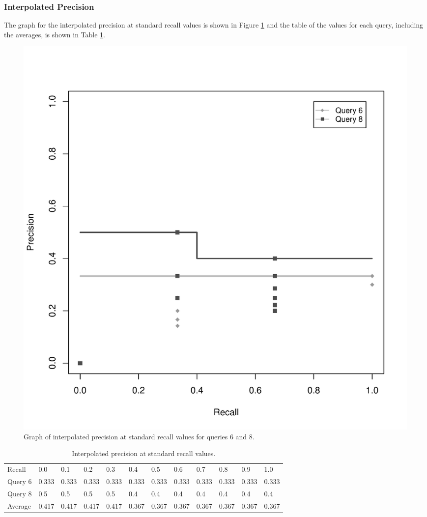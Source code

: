 \subsubsection{Interpolated Precision}
The graph for the interpolated precision at standard recall values is shown in Figure \ref{fig:iprgraph68} and the table of the values for each query, including the averages, is shown in Table \ref{tab:ipr68}.

\begin{figure}[H]
\centering
\label{fig:iprgraph68}
\includegraphics[scale=.6]{code/getrel/ipr68.pdf}
\caption{Graph of interpolated precision at standard recall values for queries 6 and 8.}
\end{figure}

\begin{table}[H]
\centering
\begin{tabular}{ l l l l l l l l l l l l }
Recall & 0.0 & 0.1 & 0.2 & 0.3 & 0.4 & 0.5 & 0.6 & 0.7 & 0.8 & 0.9 & 1.0 \\
\cline{2-12}
Query 6 & 0.333 & 0.333 & 0.333 & 0.333 & 0.333 & 0.333 & 0.333 & 0.333 & 0.333 & 0.333 & 0.333 \\
\cline{2-12}
Query 8 & 0.5 & 0.5 & 0.5 & 0.5 & 0.4 & 0.4 & 0.4 & 0.4 & 0.4 & 0.4 & 0.4 \\
\cline{2-12}
Average & 0.417 & 0.417 & 0.417 & 0.417 & 0.367 & 0.367 & 0.367 & 0.367 & 0.367 & 0.367 & 0.367 \\
\cline{2-12}
\end{tabular}
\caption{Interpolated precision at standard recall values.}
\label{tab:ipr68}
\end{table}

